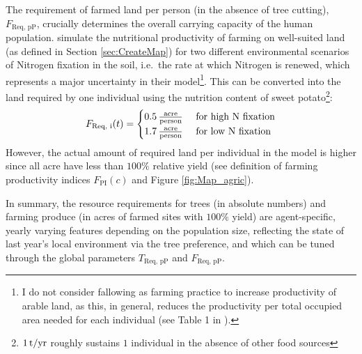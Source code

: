 The requirement of farmed land per person (in the absence of tree cutting), $F_\text{Req, pP}$, crucially determines the overall carrying capacity of the human population.
\citet{Puleston2017} simulate the nutritional productivity of farming on well-suited land (as defined in Section \ref{sec:CreateMap}) for two different environmental scenarios of Nitrogen fixation in the soil, i.e.\ the rate at which Nitrogen is renewed, which represents a major uncertainty in their model\footnote{I do not consider fallowing as farming practice to increase productivity of arable land, as this, in general, reduces the productivity per total occupied area needed for each individual (see Table 1 in \citet{Puleston2017}).}.
This can be converted into the land required by one individual using the nutrition content of sweet potato\footnote{$1\, \rm{t/yr}$ roughly sustains $1$ individual in the absence of other food sources}: 
\begin{equation}
F_\text{Req, i}(t) = \begin{cases}
	0.5 \, {\rm \frac{acre}{person} } & \text{ for high N fixation} \\
	1.7 \, {\rm \frac{acre}{person} } & \text{ for low N fixation} \\
 \end{cases}
\end{equation}
However, the actual amount of required land per individual in the model is higher since all acre have less than $100\%$ relative yield (see definition of farming productivity indices $F_\text{PI}(c)$ and Figure \ref{fig:Map_agric}).

In summary, the resource requirements for trees (in absolute numbers) and farming produce (in acres of farmed sites with $100\%$ yield) are agent-specific, yearly varying features depending on the population size, reflecting the state of last year's local environment via the tree preference, and which can be tuned through the global parameters $T_\text{Req, pP}$ and $F_\text{Req, pP}$.

